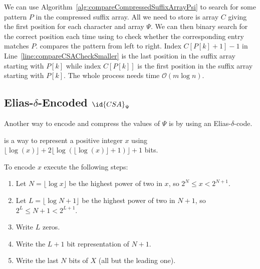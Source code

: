 We can use Algorithm~\ref{alg:compareCompressedSuffixArrayPsi} to search for some pattern $P$ in the compressed suffix array. All we need to store is array $C$ giving the first position for each character and array $\Psi$. We can then binary search for the correct position each time using  to check whether the corresponding entry matches $P$.  compares the pattern from left to right. Index $C[P[k] + 1] - 1$ in Line~\ref{line:compareCSACheckSmaller} is the last position in the suffix array starting with $P[k]$ while index $C[P[k]]$ is the first position in the suffix array starting with $P[k]$. The whole process needs time $\mathcal{O}(m\log n)$.

\subsection{Elias-$\delta$-Encoded $\id{CSA}_\Psi$}

Another way to encode and compress the values of $\Psi$ is by using an Elias-$\delta$-code.

\begin{Definition}
  \label{def:eliasDeltaEncoding}
   is a way to represent a positive integer $x$ using $\lfloor\log (x)\rfloor+2\lfloor\log(\lfloor\log (x)\rfloor + 1)\rfloor+1$ bits.

  To encode $x$ execute the following steps:
  \begin{enumerate}
    \item Let $N = \lfloor \log x \rfloor$ be the highest power of two in $x$, so $2^N \leq x < 2^{N+1}$.
    \item Let $L = \lfloor \log N + 1 \rfloor$ be the highest power of two in $N+1$, so $2^L \leq N+1 < 2^{L + 1}$.
    \item Write $L$ zeros.
    \item Write the $L+1$ bit representation of $N+1$.
    \item Write the last $N$ bits of $X$ (all but the leading one).
  \end{enumerate}
\end{Definition}

